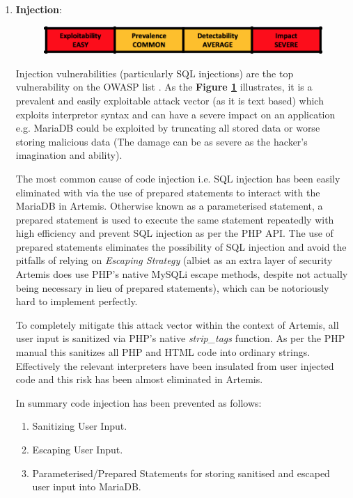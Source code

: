 \begin{enumerate}
    \item \textbf{Injection}:
    
    \begin{figure}[H]
    	\centering
    	\includegraphics[scale=0.80]{figures/injection}
    	\label{injection}
    \end{figure}
    
    
    Injection vulnerabilities (particularly SQL injections) are the top vulnerability on the OWASP list \cite{OWASP2017}. As the \textbf{Figure \ref{injection}} illustrates, it is a prevalent and easily exploitable attack vector (as it is text based) which exploits interpretor syntax and can have a severe impact on an application e.g. MariaDB could be exploited by truncating all stored data or worse storing malicious data (The damage can be as severe as the hacker's imagination and ability).
    

    The most common cause of code injection i.e. SQL injection has been easily eliminated with via the use of prepared statements to interact with the MariaDB in Artemis. Otherwise known as a parameterised statement, a prepared statement is used to execute the same statement repeatedly with high efficiency and prevent SQL injection as per the PHP API\cite{PHP}. The use of prepared statements eliminates the possibility of SQL injection and avoid the pitfalls of relying on \textit{Escaping Strategy} (albiet as an extra layer of security Artemis does use PHP's native MySQLi escape methods, despite not actually being necessary in lieu of prepared statements), which can be notoriously hard to implement perfectly.
    
    To completely mitigate this attack vector within the context of Artemis, all user input is  sanitized via PHP's native \textit{strip\_tags} function. As per the PHP manual this sanitizes all PHP and HTML code into ordinary strings. Effectively the relevant interpreters have been insulated from user injected code and this risk has been almost eliminated in Artemis.
    
    In summary code injection has been prevented as follows:
    \begin{enumerate}
        \item Sanitizing User Input.
        \item Escaping User Input.
        \item Parameterised/Prepared Statements for storing sanitised and escaped user input into MariaDB.
    \end{enumerate}
    

\end{enumerate}
